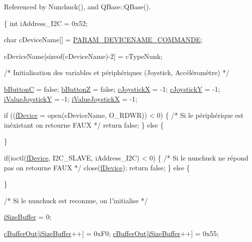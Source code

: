 Referenced by Nunchuck(), and Q\-Base\-::\-Q\-Base().


\begin{DoxyCode}
\{
    \textcolor{keywordtype}{int} iAddress\_I2C = 0x52;

    \textcolor{keywordtype}{char} cDeviceName[] = \hyperlink{nunchuck_8h_a0f3e5db0fbc68310b4cdc94e00f10f75}{PARAM\_DEVICENAME\_COMMANDE};

    cDeviceName[\textcolor{keyword}{sizeof}(cDeviceName)-2] = cTypeNunk;

    \textcolor{comment}{/*  Initialisation des variables et  périphériques (Joystick,
       Accéléromètre)   */}

    \hyperlink{classNunchuck_a1d5cac3b603b3060984e3184d795561d}{bButtonC} = \textcolor{keyword}{false};
    \hyperlink{classNunchuck_a0db1f3d2f58fafda23a5af3936c12598}{bButtonZ} = \textcolor{keyword}{false};
    \hyperlink{classNunchuck_ad9467642b97b8b008ddd137d273a22f8}{cJoystickX} = -1;
    \hyperlink{classNunchuck_aaf0f299016f5acf686f716518a7ce567}{cJoystickY} = -1;
    \hyperlink{classNunchuck_a0e084b1760acfc06305bbb339e3c8232}{iValueJoystickY} = -1;
    \hyperlink{classNunchuck_a931870243c74e9df416639c53670b234}{iValueJoystickX} = -1;

    \textcolor{keywordflow}{if} ((\hyperlink{classNunchuck_a61f4874769103ba04e13f75a08442f8e}{fDevice} = open(cDeviceName, O\_RDWR)) < 0) \{
    \textcolor{comment}{/*   Si le périphérique est inéxistant on retourne FAUX   */}
            \textcolor{keywordflow}{return} \textcolor{keyword}{false};
    \}
    \textcolor{keywordflow}{else} \{

    \}

    \textcolor{keywordflow}{if}(ioctl(\hyperlink{classNunchuck_a61f4874769103ba04e13f75a08442f8e}{fDevice}, I2C\_SLAVE, iAddress\_I2C) < 0) \{
    \textcolor{comment}{/*   Si le nunchuck ne répond pas on retourne FAUX   */}
        close(\hyperlink{classNunchuck_a61f4874769103ba04e13f75a08442f8e}{fDevice});
        \textcolor{keywordflow}{return} \textcolor{keyword}{false};
    \}
    \textcolor{keywordflow}{else} \{

    \}

    \textcolor{comment}{/*  Si le nunchuck est reconnue, on l'initialise    */}

    \hyperlink{classNunchuck_a671e2732508cdd56e51898b79e58d455}{iSizeBuffer} = 0;

    \hyperlink{classNunchuck_a4f2eea10fb4eba245c24168ce00429f8}{cBufferOut}[\hyperlink{classNunchuck_a671e2732508cdd56e51898b79e58d455}{iSizeBuffer}++] = 0xF0;
    \hyperlink{classNunchuck_a4f2eea10fb4eba245c24168ce00429f8}{cBufferOut}[\hyperlink{classNunchuck_a671e2732508cdd56e51898b79e58d455}{iSizeBuffer}++] = 0x55;



\end{DoxyCode}
